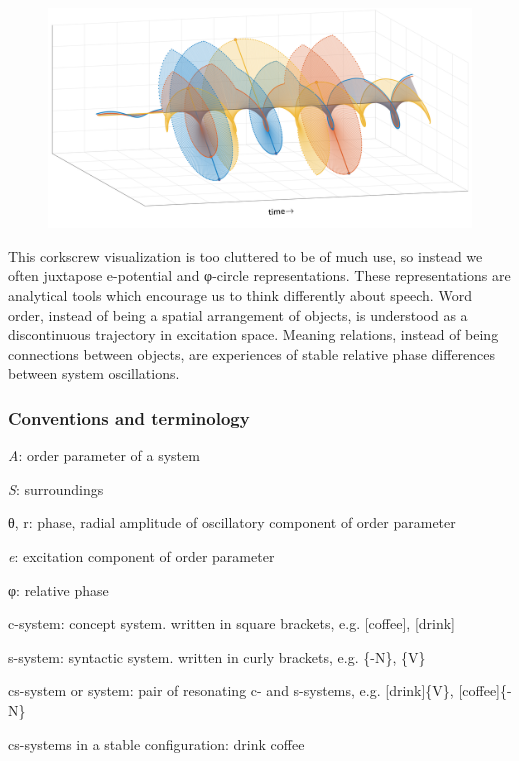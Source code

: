   
\begin{figure}
\includegraphics[width=\textwidth]{figures/Tilsen-img28.png}
\caption{\missingcaption}
\label{fig:}
\end{figure}
 

  This corkscrew visualization is too cluttered to be of much use, so instead we often juxtapose e-potential and φ{}-circle representations. These representations are analytical tools which encourage us to think differently about speech. Word order, instead of being a spatial arrangement of objects, is understood as a discontinuous trajectory in excitation space. Meaning relations, instead of being connections between objects, are experiences of stable relative phase differences between system oscillations.

\subsubsection{Conventions and terminology}

\textit{A}: order parameter of a system

\textit{S}: surroundings

θ, r: phase, radial amplitude of oscillatory component of order parameter

\textit{e}: excitation component of order parameter

φ: relative phase

c-system: concept system. written in square brackets, e.g. [coffee], [drink]

s-system: syntactic system. written in curly brackets, e.g. \{-N\}, \{V\}

cs-system or system: pair of resonating c- and s-systems, e.g. [drink]\{V\}, [coffee]\{-N\}

cs-systems in a stable configuration: {\textbar}drink coffee{\textbar}

